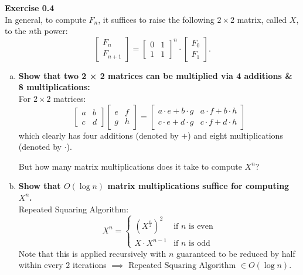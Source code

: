 \documentclass{article}
\newenvironment{problem}[2][Exercise]
    { \begin{mdframed}[backgroundcolor=gray!20] \textbf{#1 #2} \\}
    {  \end{mdframed}}
\begin{document}
\newpage
\begin{problem}{0.4}
    In general, to compute $F_n$, it suffices to raise the following $2\times 2$ matrix, called $X$, to the $n$th power:
    \[
        \begin{bmatrix}
                F_n \\
                F_{n+1}
        \end{bmatrix}
        =
        \begin{bmatrix}
                0 & 1 \\
                1 & 1
        \end{bmatrix}^n
        \cdot
        \begin{bmatrix}
                F_0 \\
                F_1
        \end{bmatrix}.
    \]
    \begin{enumerate}[(a)]
        \item \textbf{Show that two 2 × 2 matrices can be multiplied via 4 additions \& 8 multiplications:}
        \\
        For $2\times2$ matrices:
        \[
            \begin{bmatrix}
                a & b \\
                c & d
            \end{bmatrix}
            \begin{bmatrix}
                e & f \\
                g & h
            \end{bmatrix}
            =
            \begin{bmatrix}
                a\cdot e + b\cdot g & a\cdot f + b\cdot h \\
                c\cdot e + d\cdot g & c\cdot f + d\cdot h
            \end{bmatrix}
        \]
    which clearly has four additions (denoted by $+$) and eight multiplications (denoted by $\cdot$).
    
    \vspace{5 mm}
    But how many matrix multiplications does it take to compute $X^n$?

    \item \textbf{Show that $O(\log n)$ matrix multiplications suffice for computing $X^n$.}
    \\
    Repeated Squaring Algorithm:
    \[
        X^n = 
        \begin{cases}
            (X^{\frac n2})^2 &\text{if } n \text{ is even} \\
            X\cdot X^{n-1} &\text{if } n \text{ is odd}
        \end{cases}
    \]
    Note that this is applied recursively with $n$ guaranteed to be reduced by half within every $2$ iterations $\implies\text{ Repeated Squaring Algorithm }\in O(\log n)$.


\end{enumerate}
\end{problem}
\end{document}
